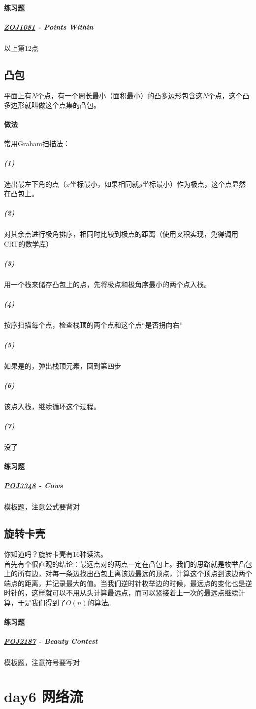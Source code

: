 \documentclass[]{cpp}
\begin{document}
\paragraph{练习题}
\subparagraph{\href{http://acm.zju.edu.cn/onlinejudge/showProblem.do?problemCode=1081}{ZOJ1081} - Points Within} 以上第12点
\subsection{凸包} 平面上有$N$个点，有一个周长最小（面积最小）的凸多边形包含这$N$个点，这个凸多边形就叫做这个点集的凸包。
\paragraph{做法} 常用Graham扫描法：
\subparagraph{(1)} 选出最左下角的点（$x$坐标最小，如果相同就$y$坐标最小）作为极点，这个点显然在凸包上。
\subparagraph{(2)} 对其余点进行极角排序，相同时比较到极点的距离（使用叉积实现，免得调用CRT的数学库）
\subparagraph{(3)} 用一个栈来储存凸包上的点，先将极点和极角序最小的两个点入栈。
\subparagraph{(4)} 按序扫描每个点，检查栈顶的两个点和这个点“是否拐向右”
\subparagraph{(5)} 如果是的，弹出栈顶元素，回到第四步
\subparagraph{(6)} 该点入栈，继续循环这个过程。
\subparagraph{(7)} 没了
\paragraph{练习题}
\subparagraph{\href{http://poj.org/problem?id=3348}{POJ3348} - Cows} 模板题，注意公式要背对
\subsection{旋转卡壳} 你知道吗？旋转卡壳有16种读法。\\
	首先有个很直观的结论：最远点对的两点一定在凸包上。我们的思路就是枚举凸包上的所有边，对每一条边找出凸包上离该边最远的顶点，计算这个顶点到该边两个端点的距离，并记录最大的值。当我们逆时针枚举边的时候，最远点的变化也是逆时针的，这样就可以不用从头计算最远点，而可以紧接着上一次的最远点继续计算，于是我们得到了$O(n)$的算法。
\paragraph{练习题}
\subparagraph{\href{http://poj.org/problem?id=2187}{POJ2187} - Beauty Contest} 模板题，注意符号要写对
\section{day6 网络流}
\end{document}
